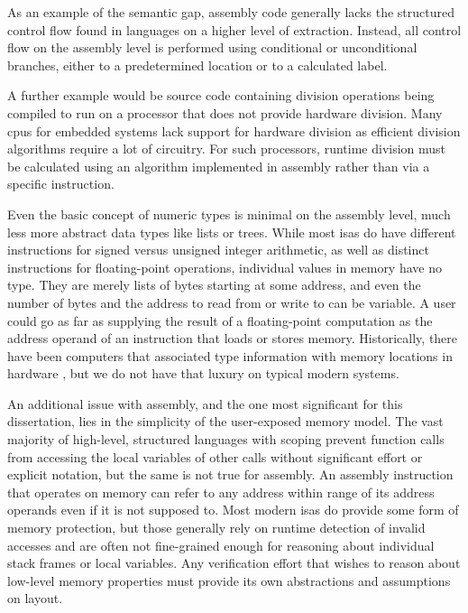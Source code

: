 As an example of the semantic gap,
assembly code generally lacks the structured control flow
found in languages on a higher level of extraction.
Instead, all control flow on the assembly level is performed using conditional
or unconditional branches, either to a predetermined location or to a calculated label.

A further example would be source code containing division operations
being compiled to run on a processor that does not provide hardware division.
Many \acp{cpu} for embedded systems lack support for hardware division
as efficient division algorithms require a lot of circuitry.
For such processors, runtime division must be calculated using an algorithm
implemented in assembly rather than via a specific instruction.

Even the basic concept of numeric types is minimal on the assembly level,
much less more abstract data types like lists or trees.
While most \acp{isa} do have different instructions
for signed versus unsigned integer arithmetic,
as well as distinct instructions for floating-point operations,
individual values in memory have no type.
They are merely lists of bytes starting at some address,
and even the number of bytes and the address to read from or write to can be variable.
A user could go as far as supplying the result of a floating-point computation
as the address operand of an instruction that loads or stores memory.
Historically, there have been computers that associated type information
with memory locations in hardware
\autocite{feustel1972rice,feustel1973advantages,thornton2008rice},
but we do not have that luxury on typical modern systems.

An additional issue with assembly,
and the one most significant for this dissertation,
lies in the simplicity of the user-exposed memory model.
The vast majority of high-level, structured languages with scoping
prevent function calls from accessing the local variables of other calls
without significant effort or explicit notation, but the same is not true for assembly.
An assembly instruction that operates on memory can refer to any
address within range of its address operands even if it is not supposed to.
Most modern \acp{isa} do provide some form of memory protection,
but those generally rely on runtime detection of invalid accesses
and are often not fine-grained enough for reasoning about individual stack frames
or local variables.
Any verification effort that wishes to reason about low-level memory properties
must provide its own abstractions and assumptions on layout.

